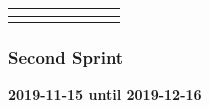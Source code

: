 \documentclass{scrartcl}
\begin{document}
\begin{table}[]
\begin{tabular}{l|l|l|l|l|l|l|l}
  \multicolumn{1}{|l|}{} &            &                          &          &                                                               &                                                                 &                                                                & \multicolumn{1}{l|}{} \\ \hline
  \multicolumn{1}{|l|}{} &            &                          &          &                                                               &                                                                 &                                                                & \multicolumn{1}{l|}{} \\ \hline
  \end{tabular}
\end{table}

\subsubsection{Second Sprint}
\textbf{2019-11-15 until 2019-12-16}
\end{document}
